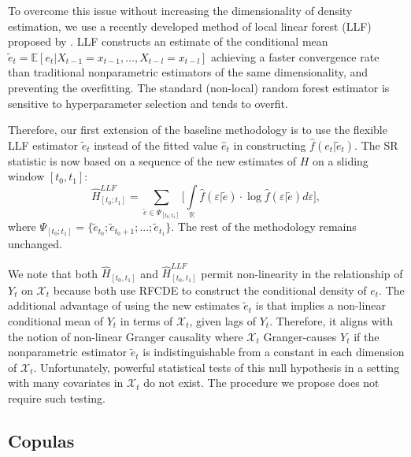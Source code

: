 To overcome this issue without increasing the dimensionality of density estimation, we use a recently developed method of local linear forest  (LLF) proposed by \cite{Friedberg}. LLF constructs an estimate of the conditional mean $\tilde{e}_t= \mathbb{E}[e_t|X_{t-1}=x_{t-1},\ldots, X_{t-l}=x_{t-l}]$ achieving a faster convergence rate than traditional nonparametric estimators of the same dimensionality, and preventing the overfitting. The standard (non-local) random forest estimator \cite[see, e.g.,][]{Breiman, Probst} is sensitive to hyperparameter  selection and tends to overfit. 

Therefore, our first extension of the baseline methodology is to use the flexible LLF estimator $\tilde{e}_t$ instead of the fitted value $\hat{e}_t$ in constructing $\hat{f}(e_t | \tilde{e}_t)$. The SR statistic is now based on a sequence of the new estimates of $H$ on a sliding window $[t_0, t_1]$:
\begin{equation}
    \hat{H}^{LLF}_{[t_0;t_1]} = \sum\limits_{\tilde{e} \in \Psi_{[t_0; t_1]}} \bigg[ \int\limits_{\mathbb{R}} \hat{f}(\varepsilon| \tilde{e}) \cdot \log{\hat{f}(\varepsilon| \tilde{e}) d\varepsilon}\bigg],
\end{equation}
where $\Psi_{[t_0; t_1]} = \{\tilde{e}_{t_0}; \tilde{e}_{t_0+1}; ...; \tilde{e}_{t_1}\}$. The rest of the methodology remains unchanged.


We note that both $\hat{H}_{[t_0, t_1]}$ and $\hat{H}^{LLF}_{[t_0, t_1]}$ permit non-linearity in the relationship of $Y_t$ on $\mathcal{X}_t$ because both use RFCDE to construct the conditional density of $e_t$. The additional advantage of using the new estimates $\tilde{e}_t$ is that implies a non-linear conditional mean of $Y_t$ in terms of $\mathcal{X}_t$, given lags of $Y_t$. Therefore, it aligns with the notion of non-linear Granger causality where $\mathcal{X}_t$ Granger-causes $Y_t$ if the nonparametric estimator  $\tilde{e}_t$ is indistinguishable from a constant in each dimension of $\mathcal{X}_t$. Unfortunately, powerful statistical tests of this null hypothesis in a setting with many covariates in $\mathcal{X}_t$  do not exist. The procedure we propose does not require such testing. 

\subsection{Copulas}


